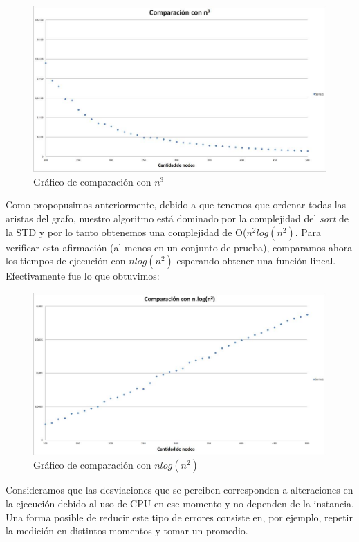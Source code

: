 \documentclass[11pt, a4paper, twoside]{article}
\begin{document}
\begin{figure}[H]
\centering
\includegraphics[scale=0.5]{imagenes/graph4.jpg}
\caption{Gráfico de comparación con $n^3$}
\end{figure}

Como propopusimos anteriormente, debido a que tenemos que ordenar todas las aristas del grafo, nuestro algoritmo está dominado por la complejidad del \textit{sort} de la STD y por lo tanto obtenemos una complejidad de O($n^2log(n^2)$. Para verificar esta afirmación (al menos en un conjunto de prueba), comparamos ahora los tiempos de ejecución con $nlog(n^2)$ esperando obtener una función lineal. Efectivamente fue lo que obtuvimos:

\begin{figure}[H]
\centering
\includegraphics[scale=0.5]{imagenes/graph1.jpg}
\caption{Gráfico de comparación con $nlog(n^2)$}
\end{figure}

Consideramos que las desviaciones que se perciben corresponden a alteraciones en la ejecución debido al uso de CPU en ese momento y no dependen de la instancia. Una forma posible de reducir este tipo de errores consiste en, por ejemplo, repetir la medición en distintos momentos y tomar un promedio.
\end{document}
